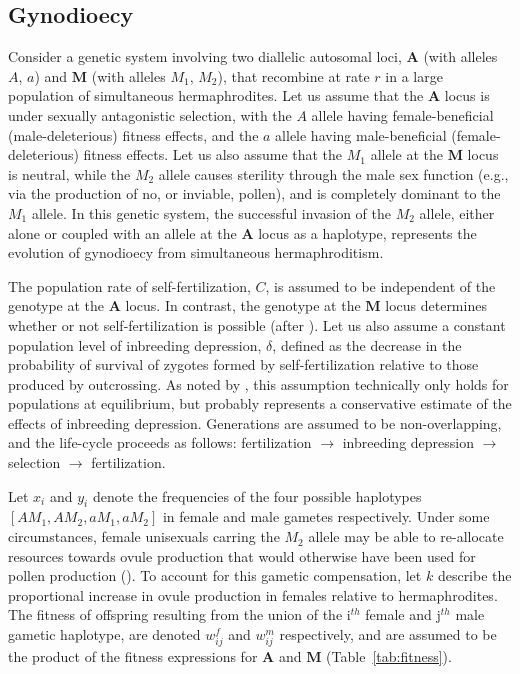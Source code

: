 \documentclass[9pt,twocolumn,twoside,lineno]{gsajnl}
\begin{document}
\subsection{Gynodioecy}
Consider a genetic system involving two diallelic autosomal loci, $\mathbf{A}$ (with alleles $A$, $a$) and $\mathbf{M}$ (with alleles $M_1$, $M_2$), that recombine at rate $r$ in a large population of simultaneous hermaphrodites. Let us assume that the $\mathbf{A}$ locus is under sexually antagonistic selection, with the $A$ allele having female-beneficial (male-deleterious) fitness effects, and the $a$ allele having male-beneficial (female-deleterious) fitness effects. Let us also assume that the $M_1$ allele at the $\mathbf{M}$ locus is neutral, while the $M_2$ allele causes sterility through the male sex function (e.g., via the production of no, or inviable, pollen), and is completely dominant to the $M_1$ allele. In this genetic system, the successful invasion of the $M_2$ allele, either alone or coupled with an allele at the $\mathbf{A}$ locus as a haplotype, represents the evolution of gynodioecy from simultaneous hermaphroditism. 

The population rate of self-fertilization, $C$, is assumed to be independent of the genotype at the $\mathbf{A}$ locus. In contrast, the genotype at the $\mathbf{M}$ locus determines whether or not self-fertilization is possible (after \citealt{Charlesworth1978a}). Let us also assume a constant population level of inbreeding depression, $\delta$, defined as the decrease in the probability of survival of zygotes formed by self-fertilization relative to those produced by outcrossing. As noted by \citet{Charlesworth1978a}, this assumption technically only holds for populations at equilibrium, but probably represents a conservative estimate of the effects of inbreeding depression. Generations are assumed to be non-overlapping, and the life-cycle proceeds as follows: fertilization $\rightarrow$ inbreeding depression $\rightarrow$ selection $\rightarrow$ fertilization.

Let $x_i$ and $y_i$ denote the frequencies of the four possible haplotypes $[AM_1,AM_2,aM_1,aM_2]$ in female and male gametes respectively. Under some circumstances, female unisexuals carring the $M_2$ allele may be able to re-allocate resources towards ovule production that would otherwise have been used for pollen production (\citealt{Lloyd1975,Lloyd1976,Charlesworth1978a}). To account for this gametic compensation, let $k$ describe the proportional increase in ovule production in females relative to hermaphrodites. The fitness of offspring resulting from the union of the i$^{th}$ female and j$^{th}$ male gametic haplotype, are denoted $w^f_{ij}$ and $w^m_{ij}$ respectively, and are assumed to be the product of the fitness expressions for $\mathbf{A}$ and $\mathbf{M}$ (Table~\ref{tab:fitness}).
\end{document}
